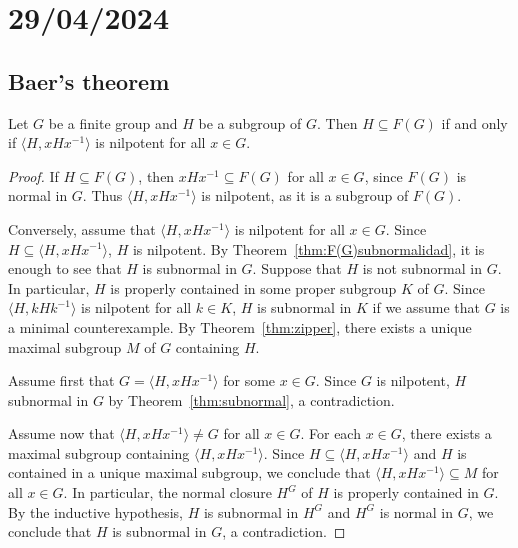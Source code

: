 \section{29/04/2024}

\subsection{Baer's theorem}

\begin{theorem}[Baer]
	\label{thm:Baer}
	Let $G$ be a finite group and $H$ be a subgroup of $G$. Then $H\subseteq
	F(G)$ if and only if $\langle H,xHx^{-1}\rangle$ is nilpotent for all 
	$x\in G$.
\end{theorem}

\begin{proof}
	If $H\subseteq F(G)$, then $xHx^{-1}\subseteq F(G)$ for all $x\in G$, since
	$F(G)$ is normal in $G$. Thus $\langle H,xHx^{-1}\rangle$ is nilpotent, as it
	is a subgroup of $F(G)$.

	Conversely, assume that $\langle H,xHx^{-1}\rangle$ is nilpotent for all  $x\in G$. Since $H\subseteq \langle H,xHx^{-1}\rangle$, $H$ is nilpotent. By
	Theorem~\ref{thm:F(G)subnormalidad}, it is enough to see that $H$ is subnormal
	in $G$. Suppose that $H$ is not subnormal in
	$G$. In particular, $H$ is properly contained in some proper subgroup $K$ of $G$. Since $\langle
	H,kHk^{-1}\rangle$ is nilpotent for all $k\in K$, $H$ is subnormal in $K$ if we assume that $G$ is a minimal counterexample. 
	By Theorem~\ref{thm:zipper}, there exists a unique
	maximal subgroup $M$ of $G$ containing $H$. 
    
    Assume first that $G=\langle H,xHx^{-1}\rangle$ for some $x\in G$. Since $G$
    is nilpotent, $H$ subnormal in $G$ by Theorem~\ref{thm:subnormal}, a
    contradiction. 

    Assume now that $\langle H,xHx^{-1}\rangle\ne G$ for all $x\in G$. For each 
	$x\in G$, there exists a maximal subgroup containing $\langle
	H,xHx^{-1}\rangle$. Since $H\subseteq \langle H,xHx^{-1}\rangle$ and $H$
	is contained in a unique maximal subgroup, we conclude that $\langle
	H,xHx^{-1}\rangle\subseteq M$ for all $x\in G$. In particular, the normal closure 
	$H^G$ of $H$ is properly contained in $G$. By the inductive hypothesis, 
	$H$ is subnormal in $H^G$ and $H^G$ is normal in $G$, we conclude that 
	$H$ is subnormal in $G$, a contradiction. 
\end{proof}

